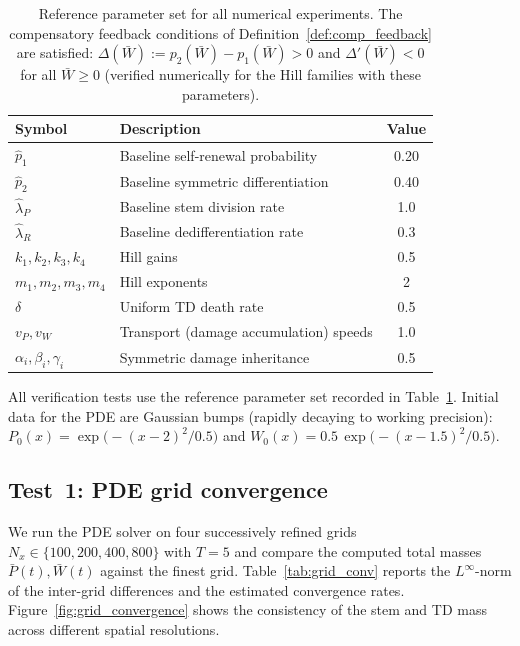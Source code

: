 \documentclass[pdflatex,sn-mathphys-ay]{sn-jnl}
\theoremstyle{thmstyleone}
\theoremstyle{definition}
\theoremstyle{remark}
\begin{document}
\begin{table}[t]
\centering
\caption{Reference parameter set for all numerical experiments.
The compensatory feedback conditions of Definition~\ref{def:comp_feedback}
are satisfied: $\Delta(\bar W):=p_2(\bar W)-p_1(\bar W)>0$ and
$\Delta'(\bar W)<0$ for all $\bar W\ge 0$
(verified numerically for the Hill families with these parameters).}
\label{tab:params}
\begin{tabular}{llc}
\hline
\textbf{Symbol} & \textbf{Description} & \textbf{Value} \\
\hline
$\hat p_1$        & Baseline self-renewal probability     & 0.20 \\
$\hat p_2$        & Baseline symmetric differentiation     & 0.40 \\
$\hat\lambda_P$   & Baseline stem division rate            & 1.0  \\
$\hat\lambda_R$   & Baseline dedifferentiation rate        & 0.3  \\
$k_1,k_2,k_3,k_4$ & Hill gains                            & 0.5  \\
$m_1,m_2,m_3,m_4$ & Hill exponents                        & 2    \\
$\delta$           & Uniform TD death rate                 & 0.5  \\
$v_P,v_W$          & Transport (damage accumulation) speeds & 1.0  \\
$\alpha_i,\beta_i,\gamma_i$ & Symmetric damage inheritance & 0.5  \\
\hline
\end{tabular}
\end{table}

All verification tests use the reference parameter set recorded in Table~\ref{tab:params}.
Initial data for the PDE are Gaussian bumps (rapidly decaying to working precision):
$P_0(x)=\exp\!\bigl(-(x-2)^2/0.5\bigr)$ and $W_0(x)=0.5\,\exp\!\bigl(-(x-1.5)^2/0.5\bigr)$.

\subsection{Test~1: PDE grid convergence}
\label{subsubsec:grid_convergence}
We run the PDE solver on four successively refined grids
$N_x\in\{100,200,400,800\}$ with $T=5$ and compare the computed total masses
$\bar P(t),\bar W(t)$ against the finest grid. Table~\ref{tab:grid_conv} reports the
$L^\infty$-norm of the inter-grid differences and the estimated convergence rates. Figure~\ref{fig:grid_convergence} shows the consistency of the stem and TD mass across different spatial resolutions.
\end{document}
